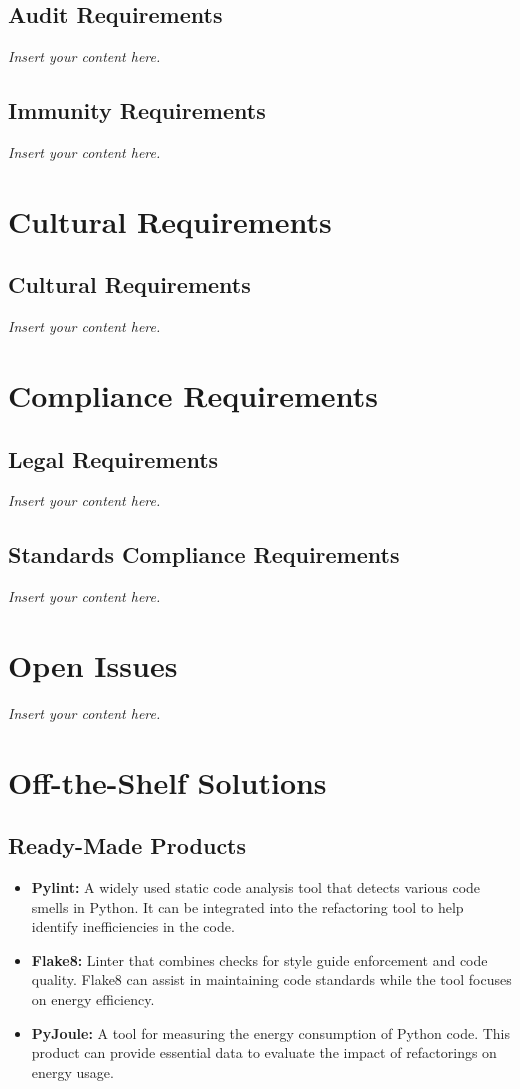 \documentclass[12pt]{article}
\newcommand{\lips}{\textit{Insert your content here.}}
\begin{document}
\subsection{Audit Requirements}
\lips
\subsection{Immunity Requirements}
\lips

\section{Cultural Requirements}
\subsection{Cultural Requirements}
\lips

\section{Compliance Requirements}
\subsection{Legal Requirements}
\lips
\subsection{Standards Compliance Requirements}
\lips

\section{Open Issues}
\lips

\section{Off-the-Shelf Solutions}
\subsection{Ready-Made Products}

\begin{itemize}
  \item \textbf{Pylint:} A widely used static code analysis tool that detects various code smells in Python. It can be integrated into the refactoring tool to help identify inefficiencies in the code.
  \item \textbf{Flake8:} Linter that combines checks for style guide enforcement and code quality. Flake8 can assist in maintaining code standards while the tool focuses on energy efficiency.
  \item \textbf{PyJoule:} A tool for measuring the energy consumption of Python code. This product can provide essential data to evaluate the impact of refactorings on energy usage.
\end{itemize}
\end{document}
